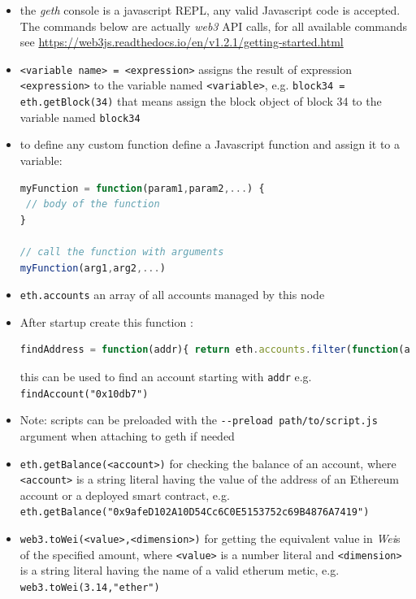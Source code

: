\documentclass[a4paper]{article}
\begin{document}
\begin{itemize}
\item the \emph{geth} console is a javascript REPL, any valid Javascript code is accepted. The commands below are actually \emph{web3} API calls, for all available commands see \url{https://web3js.readthedocs.io/en/v1.2.1/getting-started.html}

\item \verb!<variable name> = <expression>! assigns the result of expression  \verb!<expression>! to the variable named \verb!<variable>!, e.g. \verb!block34 = eth.getBlock(34)! that means assign the block object of block 34 to the variable named \verb!block34!


\item to define any custom function define a Javascript function and assign it to a variable:

\begin{lstlisting}[language=javascript]
myFunction = function(param1,param2,...) {
 // body of the function
}

// call the function with arguments
myFunction(arg1,arg2,...)
\end{lstlisting}

\item \verb!eth.accounts! an array of all accounts managed by this node

\item  After startup create this function : 
\begin{lstlisting}[language=javascript]
findAddress = function(addr){ return eth.accounts.filter(function(account){ return new RegExp(addr+".*").test(account) }) } \end{lstlisting}
this can be used to find an account starting with \verb!addr! e.g. \verb!findAccount("0x10db7")!

\item Note: scripts can be preloaded with the \verb!--preload path/to/script.js! argument when attaching to geth if needed

\item \verb!eth.getBalance(<account>)! for checking the balance of an account, where \verb!<account>! is a string literal having the value of the address of an Ethereum account or a deployed smart contract, e.g. \verb!eth.getBalance("0x9afeD102A10D54Cc6C0E5153752c69B4876A7419")!

\item \verb!web3.toWei(<value>,<dimension>)! for getting the equivalent value in \emph{Wei}s of the specified amount, where \verb!<value>! is a number literal and \verb!<dimension>! is a string literal having the name of a valid etherum metic, e.g. \verb!web3.toWei(3.14,"ether")!


\end{itemize}
\end{document}
